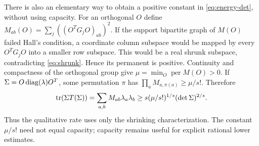 There is also an elementary way to obtain a positive constant in
\eqref{eq:energy-det}, without using capacity. For an orthogonal $O$
define $M_{ab}(O)=\sum_j((O^TG_jO)_{ab})^2$. If the support bipartite
graph of $M(O)$ failed Hall's condition, a coordinate column subspace
would be mapped by every $O^TG_jO$ into a smaller row subspace.
This would be a real shrunk subspace, contradicting \eqref{eq:shrunk}.
Hence its permanent is positive. Continuity and compactness of the
orthogonal group give
$\mu=\min_O\operatorname{per}M(O)>0$.
If $\Sigma=O\operatorname{diag}(\lambda)O^T$, some permutation $\pi$ has
$\prod_aM_{a,\pi(a)}\ge\mu/s!$. Therefore
\[
 \operatorname{tr}(\Sigma T(\Sigma))
 =\sum_{a,b}M_{ab}\lambda_a\lambda_b
 \ge s(\mu/s!)^{1/s}(\det\Sigma)^{2/s}.
\]
Thus the qualitative rate uses only the shrinking characterization.
The constant $\mu/s!$ need not equal capacity; capacity remains useful
for explicit rational lower estimates.


